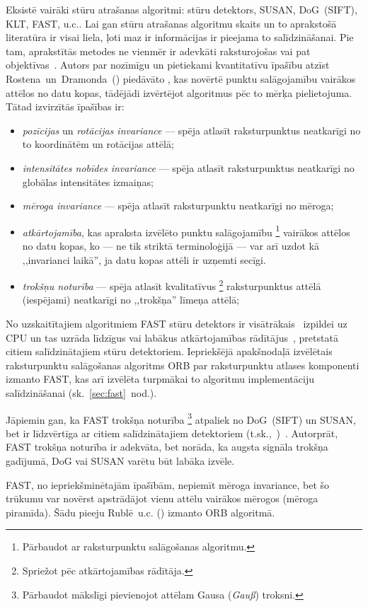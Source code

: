 Eksistē vairāki stūru atrašanas algoritmi:  stūru detektors,
SUSAN, DoG~(SIFT), KLT, FAST, u.c.. 
Lai gan stūru atrašanas algoritmu skaits un to aprakstošā literatūra ir
visai liela, ļoti maz ir informācijas ir pieejama to salīdzināšanai. Pie
tam, aprakstītās metodes ne vienmēr ir adevkāti raksturojošas vai pat
objektīvas~\cite{Mokhtarian}\cite{FAST}. Autors par nozīmīgu un 
pietiekami kvantitatīvu īpašību atzīst 
Rostena~un~Dramonda\cite{FAST}~() piedāvāto
, kas novērtē punktu salāgojamību vairākos attēlos
no datu kopas, tādējādi izvērtējot algoritmus pēc to mērķa pielietojuma.
Tātad izvirzītās īpašības ir:
\begin{itemize}
	\item \emph{pozīcijas} un \emph{rotācijas invariance} --- spēja atlasīt
		raksturpunktus neatkarīgi no to koordinātēm un rotācijas attēlā;
	\item \emph{intensitātes nobīdes invariance} --- spēja atlasīt
		raksturpunktus neatkarīgi no globālas intensitātes izmaiņas;
	\item \emph{mēroga invariance} --- spēja atlasīt raksturpunktu
		neatkarīgi no mēroga;
	\item \emph{atkārtojamība}, kas apraksta izvēlēto punktu salāgojamību%
			\footnote{Pārbaudot ar raksturpunktu salāgošanas algoritmu.}
		vairākos attēlos no datu kopas, ko --- ne tik striktā terminoloģijā ---
		var arī uzdot kā ,,invarianci laikā'', ja datu kopas attēli ir
		uzņemti secīgi.
	\item \emph{trokšņu noturība} --- spēja atlasīt kvalitatīvus%
			\footnote{Spriežot pēc atkārtojamības rādītāja.}
		raksturpunktus attēlā (iespējami) neatkarīgi no ,,trokšņa'' līmeņa attēlā;
\end{itemize}

No uzskaitītajiem algoritmiem FAST stūru detektors ir
visātrākais~\cite{Rosten-tracking}\cite{FAST} izpildei uz CPU un
tas uzrāda līdzīgus vai labākus atkārtojamības rādītājus~\cite{FAST},
pretstatā citiem salīdzinātajiem stūru detektoriem. Iepriekšējā apakšnodaļā
izvēlētais raksturpunktu salāgošanas algoritms ORB par raksturpunktu atlases
komponenti izmanto FAST, kas arī izvēlēta
turpmākai to algoritmu implementāciju salīdzināšanai
(sk.~\ref{sec:fast}~nod.).

Jāpiemin gan, ka FAST trokšņa noturība%
	\footnote{Pārbaudot mākslīgi pievienojot attēlam Gausa (\textit{Gauß}) troksni.}
atpaliek no DoG~(SIFT) un SUSAN, bet ir līdzvērtīga ar citiem
salīdzinātajiem detektoriem (t.sk.,~)~\cite{FAST}.
Autorprāt, FAST trokšņa noturība ir adekvāta, bet norāda, ka augsta signāla
trokšņa gadījumā, DoG vai SUSAN varētu būt labāka izvēle.

FAST, no iepriekšminētajām īpašībām, nepiemīt mēroga invariance, bet šo
trūkumu var novērst apstrādājot vienu attēlu vairākos mērogos (mēroga piramīda).
Šādu pieeju Rublē~u.c.\cite{ORB} () izmanto ORB algoritmā.

